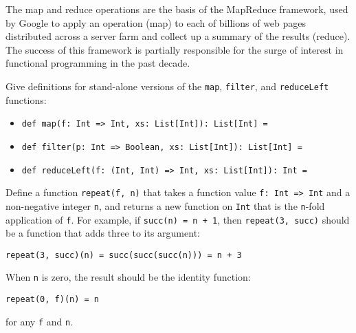 \begin{tailquote}
The map and reduce operations are the basis of the MapReduce framework, used by Google to apply an operation (map) to each of billions of web pages distributed across a server farm and collect up a summary of the results (reduce). The success of this framework is partially responsible for the surge of interest in functional programming in the past decade.
\end{tailquote}
\begin{exercises}
\problem Give definitions for stand-alone versions of the \verb|map|, \verb|filter|, and \verb|reduceLeft| functions:
\begin{itemize}
\item \verb|def map(f: Int => Int, xs: List[Int]): List[Int] =|
\item \verb|def filter(p: Int => Boolean, xs: List[Int]): List[Int] =|
\item \verb|def reduceLeft(f: (Int, Int) => Int, xs: List[Int]): Int =|
\end{itemize}

\problem Define a function \verb|repeat(f, n)| that takes a function value \verb|f: Int => Int| and a non-negative integer \verb|n|, and returns a new function on \verb|Int| that is the \verb|n|-fold application of \verb|f|. For example, if \verb|succ(n) = n + 1|, then \verb|repeat(3, succ)| should be a function that adds three to its argument:
\begin{verbatim}
repeat(3, succ)(n) = succ(succ(succ(n))) = n + 3
\end{verbatim}
When \verb|n| is zero, the result should be the identity function:
\begin{verbatim}
repeat(0, f)(n) = n
\end{verbatim}
for any \verb|f| and \verb|n|.


\end{exercises}
